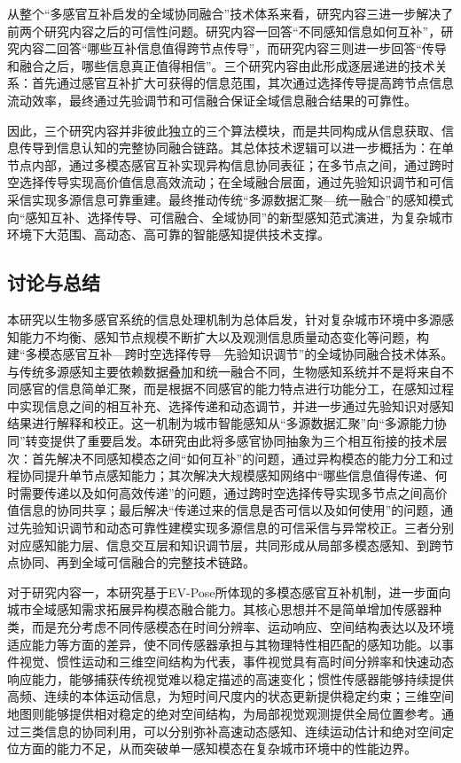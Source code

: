 从整个“多感官互补启发的全域协同融合”技术体系来看，研究内容三进一步解决了前两个研究内容之后的可信性问题。研究内容一回答“不同感知信息如何互补”，研究内容二回答“哪些互补信息值得跨节点传导”，而研究内容三则进一步回答“传导和融合之后，哪些信息真正值得相信”。三个研究内容由此形成逐层递进的技术关系：首先通过感官互补扩大可获得的信息范围，其次通过选择传导提高跨节点信息流动效率，最终通过先验调节和可信融合保证全域信息融合结果的可靠性。

因此，三个研究内容并非彼此独立的三个算法模块，而是共同构成从信息获取、信息传导到信息认知的完整协同融合链路。其总体技术逻辑可以进一步概括为：在单节点内部，通过多模态感官互补实现异构信息协同表征；在多节点之间，通过跨时空选择传导实现高价值信息高效流动；在全域融合层面，通过先验知识调节和可信采信实现多源信息可靠重建。最终推动传统“多源数据汇聚—统一融合”的感知模式向“感知互补、选择传导、可信融合、全域协同”的新型感知范式演进，为复杂城市环境下大范围、高动态、高可靠的智能感知提供技术支撑。


\subsection{讨论与总结}

本研究以生物多感官系统的信息处理机制为总体启发，针对复杂城市环境中多源感知能力不均衡、感知节点规模不断扩大以及观测信息质量动态变化等问题，构建“多模态感官互补—跨时空选择传导—先验知识调节”的全域协同融合技术体系。与传统多源感知主要依赖数据叠加和统一融合不同，生物感知系统并不是将来自不同感官的信息简单汇聚，而是根据不同感官的能力特点进行功能分工，在感知过程中实现信息之间的相互补充、选择传递和动态调节，并进一步通过先验知识对感知结果进行解释和校正。这一机制为城市智能感知从“多源数据汇聚”向“多源能力协同”转变提供了重要启发。本研究由此将多感官协同抽象为三个相互衔接的技术层次：首先解决不同感知模态之间“如何互补”的问题，通过异构模态的能力分工和过程协同提升单节点感知能力；其次解决大规模感知网络中“哪些信息值得传递、何时需要传递以及如何高效传递”的问题，通过跨时空选择传导实现多节点之间高价值信息的协同共享；最后解决“传递过来的信息是否可信以及如何使用”的问题，通过先验知识调节和动态可靠性建模实现多源信息的可信采信与异常校正。三者分别对应感知能力层、信息交互层和知识调节层，共同形成从局部多模态感知、到跨节点协同、再到全域可信融合的完整技术链路。

对于研究内容一，本研究基于EV-Pose所体现的多模态感官互补机制，进一步面向城市全域感知需求拓展异构模态融合能力。其核心思想并不是简单增加传感器种类，而是充分考虑不同传感模态在时间分辨率、运动响应、空间结构表达以及环境适应能力等方面的差异，使不同传感器承担与其物理特性相匹配的感知功能。以事件视觉、惯性运动和三维空间结构为代表，事件视觉具有高时间分辨率和快速动态响应能力，能够捕获传统视觉难以稳定描述的高速变化；惯性传感器能够持续提供高频、连续的本体运动信息，为短时间尺度内的状态更新提供稳定约束；三维空间地图则能够提供相对稳定的绝对空间结构，为局部视觉观测提供全局位置参考。通过三类信息的协同利用，可以分别弥补高速动态感知、连续运动估计和绝对空间定位方面的能力不足，从而突破单一感知模态在复杂城市环境中的性能边界。

